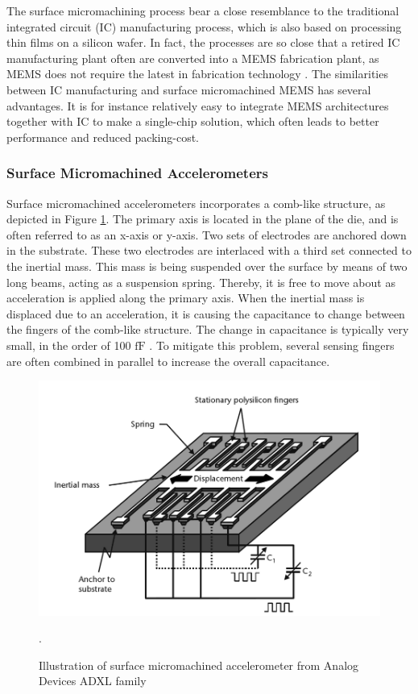 The surface micromachining process bear a close resemblance to the traditional integrated circuit (IC) manufacturing process, which is also based on processing thin films on a silicon wafer. In fact, the processes are so close that a retired IC manufacturing plant often are converted into a MEMS fabrication plant, as MEMS does not require the latest in fabrication technology \cite[p.~4]{kaajakari09}. The similarities between IC manufacturing and surface micromachined MEMS has several advantages. It is for instance relatively easy to integrate MEMS architectures together with IC to make a single-chip solution, which often leads to better performance and reduced packing-cost. 

\subsubsection{Surface Micromachined Accelerometers}

Surface micromachined accelerometers incorporates a comb-like structure, as depicted in Figure \ref{fig:surface_micromachined}. The primary axis is located in the plane of the die, and is often referred to as an x-axis or y-axis. Two sets of electrodes are anchored down in the substrate. These two electrodes are interlaced with a third set connected to the inertial mass. This mass is being suspended over the surface by means of two long beams, acting as a suspension spring. Thereby, it is free to move about as acceleration is applied along the primary axis. When the inertial mass is displaced due to an acceleration, it is causing the capacitance to change between the fingers of the comb-like structure. The change in capacitance is typically very small, in the order of 100 $\si{\femto\farad}$ \cite[p.~101]{maluf04}. To mitigate this problem, several sensing fingers are often combined in parallel to increase the overall capacitance.

\begin{figure}[h]
\centering
\includegraphics[scale=0.3]{fig/surface_micromachined.png}
\caption{Illustration of surface micromachined accelerometer from Analog Devices ADXL family \cite[p.~101]{maluf04}}.
\label{fig:surface_micromachined}
\end{figure}

